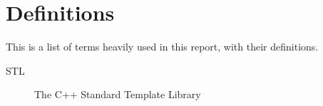 \section*{Definitions}
This is a list of terms heavily used in this report, with their definitions.

\begin{description}
\item[STL] The C++ Standard Template Library 
\end{description}
